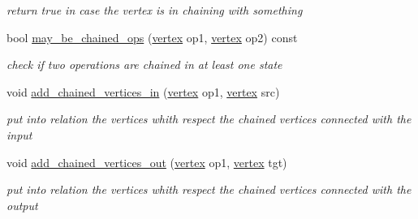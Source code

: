 \begin{DoxyCompactItemize}
\begin{DoxyCompactList}\small\item\em return true in case the vertex is in chaining with something \end{DoxyCompactList}\item 
bool \hyperlink{classChainingInformation_a071c018afe565b6950876779213150ec}{may\+\_\+be\+\_\+chained\+\_\+ops} (\hyperlink{graph_8hpp_abefdcf0544e601805af44eca032cca14}{vertex} op1, \hyperlink{graph_8hpp_abefdcf0544e601805af44eca032cca14}{vertex} op2) const
\begin{DoxyCompactList}\small\item\em check if two operations are chained in at least one state \end{DoxyCompactList}\item 
void \hyperlink{classChainingInformation_a0fdcde9a175528d1f79dcedc929edc8d}{add\+\_\+chained\+\_\+vertices\+\_\+in} (\hyperlink{graph_8hpp_abefdcf0544e601805af44eca032cca14}{vertex} op1, \hyperlink{graph_8hpp_abefdcf0544e601805af44eca032cca14}{vertex} src)
\begin{DoxyCompactList}\small\item\em put into relation the vertices whith respect the chained vertices connected with the input \end{DoxyCompactList}\item 
void \hyperlink{classChainingInformation_af5626b18e31136d5d01910be8836bc16}{add\+\_\+chained\+\_\+vertices\+\_\+out} (\hyperlink{graph_8hpp_abefdcf0544e601805af44eca032cca14}{vertex} op1, \hyperlink{graph_8hpp_abefdcf0544e601805af44eca032cca14}{vertex} tgt)
\begin{DoxyCompactList}\small\item\em put into relation the vertices whith respect the chained vertices connected with the output \end{DoxyCompactList}\end{DoxyCompactItemize}
